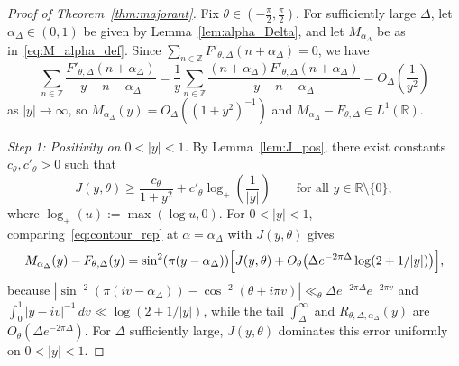 \documentclass[11pt,a4paper]{amsart}
\theoremstyle{remark}
\numberwithin{equation}{section}
\newcommand{\R}{\mathbb{R}}
\newcommand{\Z}{\mathbb{Z}}
\begin{document}
\begin{proof}[Proof of Theorem~\ref{thm:majorant}]
Fix $\theta \in (-\frac{\pi}{2},\frac{\pi}{2})$. For sufficiently large $\Delta$, let $\alpha_\Delta \in (0,1)$ be given by Lemma~\ref{lem:alpha_Delta}, and let $M_{\alpha_\Delta}$ be as in~\eqref{eq:M_alpha_def}. Since $\sum_{n\in\Z} F'_{\theta,\Delta}(n+\alpha_\Delta) = 0$, we have
\[
  \sum_{n\in\Z}\frac{F'_{\theta,\Delta}(n+\alpha_\Delta)}{y-n-\alpha_\Delta} = \frac{1}{y}\sum_{n\in\Z}\frac{(n+\alpha_\Delta)F'_{\theta,\Delta}(n+\alpha_\Delta)}{y-n-\alpha_\Delta} = O_\Delta\!\left(\frac{1}{y^2}\right)
\]
as $|y|\to\infty$, so $M_{\alpha_\Delta}(y) = O_\Delta((1+y^2)^{-1})$ and $M_{\alpha_\Delta} - F_{\theta,\Delta} \in L^1(\R)$.

\emph{Step 1: Positivity on $0 < |y| < 1$.} By Lemma~\ref{lem:J_pos}, there exist constants $c_\theta, c'_\theta > 0$ such that
\[
  J(y,\theta) \ge \frac{c_\theta}{1+y^2} + c'_\theta\log_+\!\left(\frac{1}{|y|}\right) \qquad \text{for all } y \in \R\setminus\{0\},
\]
where $\log_+(u) := \max(\log u, 0)$. For $0 < |y| < 1$, comparing~\eqref{eq:contour_rep} at $\alpha = \alpha_\Delta$ with $J(y,\theta)$ gives
\[
  M_{\alpha_\Delta}(y) - F_{\theta,\Delta}(y) = \sin^2(\pi(y-\alpha_\Delta))\Bigl[J(y,\theta) + O_\theta\bigl(\Delta e^{-2\pi\Delta}\log(2+1/|y|)\bigr)\Bigr],
\]
because $|\sin^{-2}(\pi(iv-\alpha_\Delta)) - \cos^{-2}(\theta+i\pi v)| \ll_\theta \Delta e^{-2\pi\Delta}e^{-2\pi v}$ and $\int_0^1 |y-iv|^{-1}\,dv \ll \log(2+1/|y|)$, while the tail $\int_\Delta^\infty$ and $R_{\theta,\Delta,\alpha_\Delta}(y)$ are $O_\theta(\Delta e^{-2\pi\Delta})$. For $\Delta$ sufficiently large, $J(y,\theta)$ dominates this error uniformly on $0 < |y| < 1$.


\end{proof}
\end{document}
